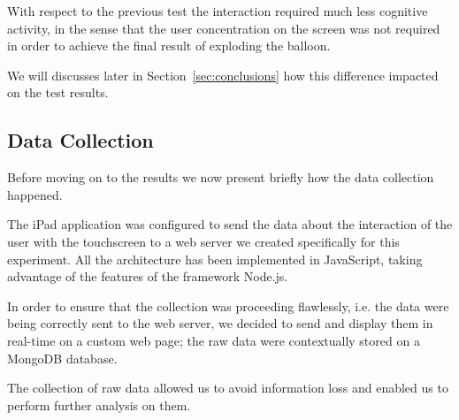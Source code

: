 With respect to the previous test the interaction required much less cognitive activity, in the sense that the user concentration on the screen was not required in order to achieve the final result of exploding the balloon.

We will discusses later in Section~\ref{sec:conclusions} how this difference impacted on the test results.

\subsection{Data Collection}
Before moving on to the results we now present briefly how the data collection happened.

The iPad application was configured to send the data about the interaction of the user with the touchscreen to a web server we created specifically for this experiment. All the architecture has been implemented in JavaScript, taking advantage of the features of the framework Node.js.

In order to ensure that the collection was proceeding flawlessly, i.e. the data were being correctly sent to the web server, we decided to send and display them in real-time on a custom web page; the raw data were contextually stored on a MongoDB database.

The collection of raw data allowed us to avoid information loss and enabled us to perform further analysis on them.